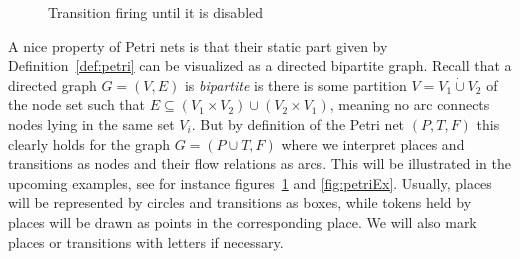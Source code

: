 \documentclass[
  paper=a4,
  titlepage,
  bibliography=totoc,
  pagesize=pdftex
]{scrartcl}
\numberwithin{figure}{section}
\numberwithin{equation}{section}
\numberwithin{table}{section}
\newcommand*\dotcup{\mathbin{\dot{\cup}}}
\theoremstyle{definition}
\numberwithin{definition}{section}
\begin{document}
\begin{figure}[htbp]
  \centering
  \caption{Transition firing until it is disabled}
  \label{fig:firing}
\end{figure}

A nice property of Petri nets is that their static part given by
Definition~\ref{def:petri} can be visualized as a directed bipartite graph. Recall that a
directed graph $G = (V,E)$ is \emph{bipartite} is there is some partition $V = V_1 \dotcup
V_2$ of the node set such that $E \subseteq (V_1 \times V_2) \cup (V_2 \times V_1)$,
meaning no arc connects nodes lying in the same set $V_i$. But by definition of the Petri
net $(P,T,F)$ this clearly holds for the graph $G = (P \cup T, F)$ where we interpret
places and transitions as nodes and their flow relations as arcs. This will be illustrated
in the upcoming examples, see for instance figures~\ref{fig:firing} and \ref{fig:petriEx}.
Usually, places will be represented by circles and transitions as boxes, while tokens held
by places will be drawn as points in the corresponding place. We will also mark places or
transitions with letters if necessary.
\end{document}
